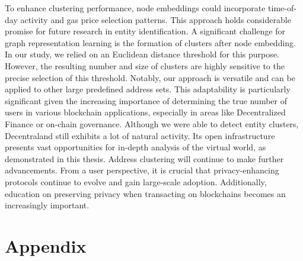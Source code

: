 \documentclass[12pt,a4paper,titlepage,oneside,english]{article}
\begin{document}
To enhance clustering performance, node embeddings could incorporate time-of-day activity and gas price selection patterns. This approach holds considerable promise for future research in entity identification. \newline
A significant challenge for graph representation learning is the formation of clusters after node embedding. In our study, we relied on an Euclidean distance threshold for this purpose. However, the resulting number and size of clusters are highly sensitive to the precise selection of this threshold. \newline
Notably, our approach is versatile and can be applied to other large predefined address sets. This adaptability is particularly significant given the increasing importance of determining the true number of users in various blockchain applications, especially in areas like Decentralized Finance or on-chain governance. \newline
Although we were able to detect entity clusters, Decentraland still exhibits a lot of natural activity. Its open infrastructure presents vast opportunities for in-depth analysis of the virtual world, as demonstrated in this thesis. \newline
Address clustering will continue to make further advancements. From a user perspective, it is crucial that privacy-enhancing protocols continue to evolve and gain large-scale adoption. Additionally, education on preserving privacy when transacting on blockchains becomes an increasingly important.



\newpage
\setcounter{page}{1}
\onehalfspacing
{}



\section{Appendix}
\end{document}
